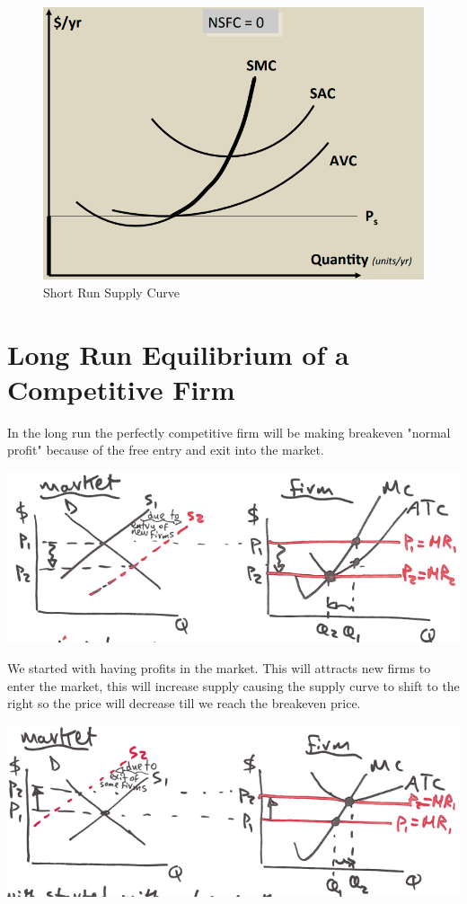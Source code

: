 \documentclass[../ECON-281-Notes.tex]{subfiles}
\begin{document}
\begin{figure}[!h]
  \centering
  \includegraphics[width=0.75\columnwidth]{assets/image-2021-12-11-12-07-15.png}
  \caption{Short Run Supply Curve}
  \label{fig:SR_supply_curve}
\end{figure}
\newpage
\section{Long Run Equilibrium of a Competitive Firm}
In the long run the perfectly competitive firm will be making breakeven "normal profit" because of the free entry and exit into the market. 

\includegraphics[width=\columnwidth]{assets/image-2021-12-11-12-10-51.png}

We started with having profits in the market. This will attracts new firms to enter the market, this will increase supply causing the supply curve to shift to the right so the price will decrease till we reach the breakeven price.

\includegraphics[width=\columnwidth]{assets/image-2021-12-11-12-11-09.png}
\end{document}
